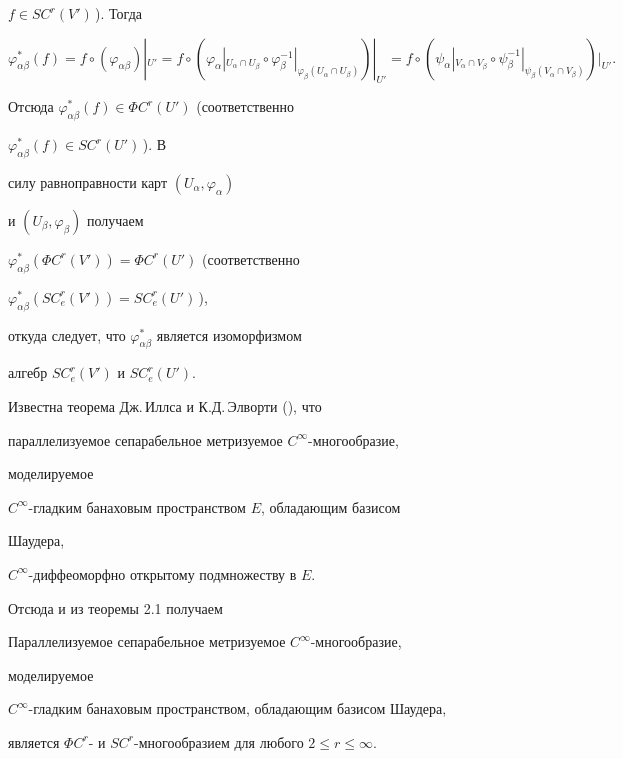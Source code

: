\begin{pf}
$f\in SC^r(V')\,$). Тогда


$$


\varphi^*_{\alpha\beta}(f)=f\circ(\varphi_{\alpha\beta})|_{U'}=


f\circ(\varphi_\alpha|_{U_\alpha\cap U_\beta}\circ


\varphi^{-1}_\beta|_{\varphi_\beta(U_\alpha\cap U_\beta)})


|_{U'}=f\circ(\psi_\alpha|_{V_\alpha\cap V_\beta}\circ


\psi^{-1}_\beta|_{\psi_\beta(V_\alpha\cap V_\beta)})


|_{U'}.


$$





Отсюда $\varphi^*_{\alpha\beta}(f)\in\Phi C^r(U')$ (соответственно


$\varphi^*_{\alpha\beta}(f)\in SC^r(U')\,$). В


силу равноправности карт $(U_\alpha,\varphi_\alpha)$


и $(U_\beta,\varphi_\beta)$ получаем


$\varphi^*_{\alpha\beta}(\Phi C^r(V'))=\Phi C^r(U')$ (соответственно


$\varphi^*_{\alpha\beta}(SC^r_e(V'))=SC^r_e(U')$\,),


откуда следует, что $\varphi^*_{\alpha\beta}$ является изоморфизмом


алгебр $SC^r_e(V')$ и $SC^r_e(U')$.


\end{pf}





Известна теорема Дж.\,Иллса и К.Д.\,Элворти (\cite{15}), что


параллелизуемое сепарабельное метризуемое $C^\infty$-многообразие,


моделируемое


$C^\infty$-гладким банаховым пространством $E$, обладающим базисом


Шаудера,


$C^\infty$-диффеоморфно открытому подмножеству в $E$.


Отсюда и из теоремы 2.1 получаем





\begin{cors}


Параллелизуемое сепарабельное метризуемое $C^\infty$-многообразие,


моделируемое


$C^\infty$-гладким банаховым пространством, обладающим базисом Шаудера,


является $\Phi C^r$- и $SC^r$-многообразием для любого $2\le r\le\infty$.


\end{cors}





